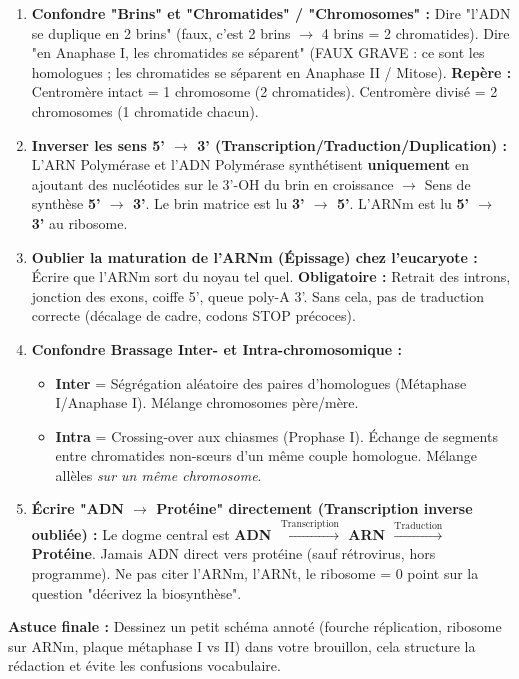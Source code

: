 \documentclass[11pt]{article}
\begin{document}
\begin{attention}
    \begin{enumerate}
        \item \textbf{Confondre "Brins" et "Chromatides" / "Chromosomes" :} Dire "l'ADN se duplique en 2 brins" (faux, c'est 2 brins $\rightarrow$ 4 brins = 2 chromatides). Dire "en Anaphase I, les chromatides se séparent" (FAUX GRAVE : ce sont les homologues ; les chromatides se séparent en Anaphase II / Mitose). \textbf{Repère :} Centromère intact = 1 chromosome (2 chromatides). Centromère divisé = 2 chromosomes (1 chromatide chacun).
        \item \textbf{Inverser les sens 5' $\rightarrow$ 3' (Transcription/Traduction/Duplication) :} L'ARN Polymérase et l'ADN Polymérase synthétisent \textbf{uniquement} en ajoutant des nucléotides sur le 3'-OH du brin en croissance $\rightarrow$ Sens de synthèse \textbf{5' $\rightarrow$ 3'}. Le brin matrice est lu \textbf{3' $\rightarrow$ 5'}. L'ARNm est lu \textbf{5' $\rightarrow$ 3'} au ribosome.
        \item \textbf{Oublier la maturation de l'ARNm (Épissage) chez l'eucaryote :} Écrire que l'ARNm sort du noyau tel quel. \textbf{Obligatoire :} Retrait des introns, jonction des exons, coiffe 5', queue poly-A 3'. Sans cela, pas de traduction correcte (décalage de cadre, codons STOP précoces).
        \item \textbf{Confondre Brassage Inter- et Intra-chromosomique :}
            \begin{itemize}
                \item \textbf{Inter} = Ségrégation aléatoire des paires d'homologues (Métaphase I/Anaphase I). Mélange chromosomes père/mère.
                \item \textbf{Intra} = Crossing-over aux chiasmes (Prophase I). Échange de segments entre chromatides non-sœurs d'un même couple homologue. Mélange allèles \emph{sur un même chromosome}.
            \end{itemize}
        \item \textbf{Écrire "ADN $\rightarrow$ Protéine" directement (Transcription inverse oubliée) :} Le dogme central est \textbf{ADN $\xrightarrow{\text{Transcription}}$ ARN $\xrightarrow{\text{Traduction}}$ Protéine}. Jamais ADN direct vers protéine (sauf rétrovirus, hors programme). Ne pas citer l'ARNm, l'ARNt, le ribosome = 0 point sur la question "décrivez la biosynthèse".
    \end{enumerate}
    \textbf{Astuce finale :} Dessinez un petit schéma annoté (fourche réplication, ribosome sur ARNm, plaque métaphase I vs II) dans votre brouillon, cela structure la rédaction et évite les confusions vocabulaire.
\end{attention}
\end{document}
